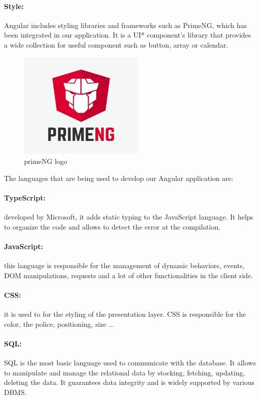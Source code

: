 \documentclass[12pt,a4paper,table,english]{article}
\begin{document}
	\paragraph{Style:}
	Angular includes styling libraries and frameworks such as PrimeNG, which has been integrated in our application. It is a UI* component's library that provides a wide collection for useful component such as button, array or calendar.\\
	
	\begin{figure}[H]
		\centering
		\includegraphics[width=60mm]{Image/primeNG}
		\caption{primeNG logo}
		\label{fig:primeNG logo}
	\end{figure}
	
	\noindent The languages that are being used to develop our Angular application are:
	
	\paragraph{TypeScript:} developed by Microsoft, it adds static typing to the JavaScript language. It helps to organize the code and allows to detect the error at the compilation.
	
	\paragraph{JavaScript:} this language is responsible for the management of dynamic behaviors, events, DOM manipulations, requests and a lot of other functionalities in the client side.
	
	\paragraph{CSS:} it is used to for the styling of the presentation layer. CSS is responsible for the color, the police, positioning, size ...
	
	\paragraph{SQL:} SQL is the most basic language used to communicate with the database. It allows to manipulate and manage the relational data by stocking, fetching, updating, deleting the data. It guarantees data integrity and is widely supported by various DBMS.
	
\end{document}
